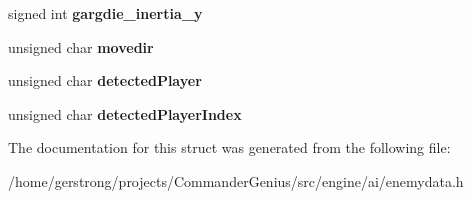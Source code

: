 \begin{DoxyCompactItemize}
\item 
\hypertarget{structst_garg_data_a710acfc623de77bf50d81900339e434a}{
signed int {\bfseries gargdie\_\-inertia\_\-y}}
\label{structst_garg_data_a710acfc623de77bf50d81900339e434a}

\item 
\hypertarget{structst_garg_data_aac43dadde56303bb48e432db293af478}{
unsigned char {\bfseries movedir}}
\label{structst_garg_data_aac43dadde56303bb48e432db293af478}

\item 
\hypertarget{structst_garg_data_a71e75a2fa28879995c944274cafa36c5}{
unsigned char {\bfseries detectedPlayer}}
\label{structst_garg_data_a71e75a2fa28879995c944274cafa36c5}

\item 
\hypertarget{structst_garg_data_a93d8b9f54299f3fa44ee810f129f3006}{
unsigned char {\bfseries detectedPlayerIndex}}
\label{structst_garg_data_a93d8b9f54299f3fa44ee810f129f3006}

\end{DoxyCompactItemize}


The documentation for this struct was generated from the following file:\begin{DoxyCompactItemize}
\item 
/home/gerstrong/projects/CommanderGenius/src/engine/ai/enemydata.h\end{DoxyCompactItemize}
